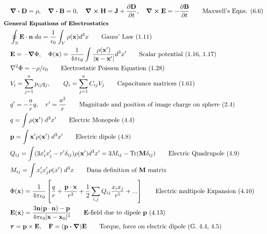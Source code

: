 \documentclass[10pt]{article}
\newcommand{\ve}[1]{\boldsymbol{\mathbf{#1}}}
\newcommand{\vect}[1]{\boldsymbol{\mathbf{#1}}}
\newcommand{\vc}[1]{\mathbf{#1}}
\newcommand{\eo}{\epsilon_0}
\newcommand{\pder}[2]{\frac{\partial #1}{\partial #2}}
\newcommand{\K}{\frac{1}{4 \pi \eo}}
\begin{document}
\begin{multicols}{2}
	\tiny
	\setlength{\abovedisplayskip}{-25pt}
	\setlength{\belowdisplayskip}{0pt}
	\setlength{\abovedisplayshortskip}{0pt}
	\setlength{\belowdisplayshortskip}{0pt}
	\begin{align*}
		& \ve{\nabla \cdot D} = \rho, \quad \ve{\nabla \cdot B} = 0, \quad \ve{\nabla \times H} = \ve{J}+\pder{\ve{D}}{t},\quad \ve{\nabla \times E} = - \pder{\ve{B}}{t} \tag*{Maxwell's Eqns. (6.6)}\\
	& \small \hspace{-10pt} \textbf{General Equations of Electrostatics} \small \\
		& \oint_S \vc{E} \cdot \vc{n} \; da = \frac{1}{\eo} \int_V \rho(\vc{x}) d^3x	\tag*{Gauss' Law (1.11)} \\
		& \ve{E} = -\ve{\nabla} \Phi, \quad \Phi(\vc{x}) = \K \int \frac{\rho (\vc{x}')}{|\vc{x} - \vc{x}'|} d^3 x' \tag*{Scalar potential (1.16, 1.17)} \\
		& \nabla^2 \Phi = -\rho/\eo	\tag*{Electrostatic Poisson Equation (1.28)} \\
		& V_i = \sum_{j=1}^{n} p_{ij} q_j,  \qquad Q_i = \sum_{j=1}^{n} C_{ij} V_j  \tag*{Capacitance matrices (1.61)} \\
		& q' = -\frac{a}{r} q, \quad r' = \frac{a^2}{r}		\tag*{Magnitude and position of image charge on sphere (2.4)} \\
		& q = \int \rho(\vect{x}') \; d^3x'	\tag*{Electric Monopole (4.4)} \\
		& \vect{p} = \int \vect{x}' \rho(\vect{x}') \; d^3x'	\tag*{Electric dipole (4.8)} \\
		& Q_{ij} = \int (3 x_i' x_j'- r' \delta_{ij})\rho(\vect{x}') d^3x' = 3 M_{ij} - \text{Tr}(\vect{M} \delta_{ij})		\tag*{Electric Quadrupole (4.9)} \\
		& M_{ij} = \int x_i' x_j' \rho(x') \; d^3 x \tag*{Dana definition of $\ve{M}$ matrix} \\
		&\Phi(\vect{x}) = \K \left[ \frac{q}{r} + \frac{ \vect{p} \cdot \vect{x}}{r^3} + \frac{1}{2} \sum_{i,j} Q_{ij} \frac{x_i x_j}{r^5} + ... \right] \tag*{Electric multipole Expansion (4.10)} \\
		& \vect{E}(\vect{x}) = \frac{3 \vect{n}(\vect{p} \cdot \vect{n}) - \vect{p}}{4 \pi \eo |\vect{x} - \vect{x}_0|^3} \tag*{$\vect{E}$-field due to dipole $\vect{p}$ (4.13)} \\
		& \ve{\tau} = \ve{p} \times \ve{E}, \quad \ve{F} = (\ve{p \cdot \nabla}) \ve{E} \tag*{Torque, force on electric dipole (G. 4.4, 4.5)} \\

\end{align*}
\end{multicols}
\end{document}
